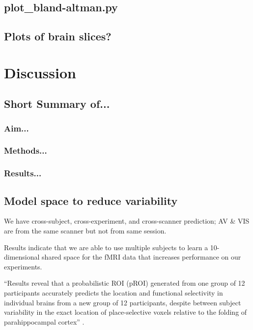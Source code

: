 \subsection{plot\_bland-altman.py}



\subsection{Plots of brain slices?}



\section{Discussion}


\subsection{Short Summary of...}

\subsubsection{Aim...}

\subsubsection{Methods...}

\subsubsection{Results...}


\subsection{Model space to reduce variability}

We have cross-subject, cross-experiment, and cross-scanner prediction; AV \& VIS
are from the same scanner but not from same session.

%
Results indicate that we are able to use multiple subjects to learn a
10-dimensional shared space for the fMRI data that increases performance on our
experiments.

%
``Results reveal that a probabilistic ROI (pROI) generated from one group of 12
participants accurately predicts the location and functional selectivity in
individual brains from a new group of 12 participants, despite between subject
variability in the exact location of place-selective voxels relative to the
folding of parahippocampal cortex'' \citep{weiner2018defining}.



